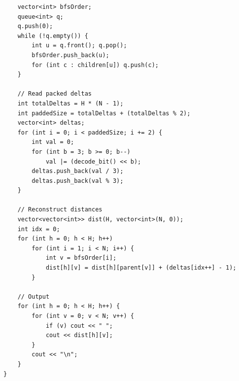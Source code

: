 \documentclass[11pt,a4paper]{article}
\begin{document}
\begin{lstlisting}
    vector<int> bfsOrder;
    queue<int> q;
    q.push(0);
    while (!q.empty()) {
        int u = q.front(); q.pop();
        bfsOrder.push_back(u);
        for (int c : children[u]) q.push(c);
    }

    // Read packed deltas
    int totalDeltas = H * (N - 1);
    int paddedSize = totalDeltas + (totalDeltas % 2);
    vector<int> deltas;
    for (int i = 0; i < paddedSize; i += 2) {
        int val = 0;
        for (int b = 3; b >= 0; b--)
            val |= (decode_bit() << b);
        deltas.push_back(val / 3);
        deltas.push_back(val % 3);
    }

    // Reconstruct distances
    vector<vector<int>> dist(H, vector<int>(N, 0));
    int idx = 0;
    for (int h = 0; h < H; h++)
        for (int i = 1; i < N; i++) {
            int v = bfsOrder[i];
            dist[h][v] = dist[h][parent[v]] + (deltas[idx++] - 1);
        }

    // Output
    for (int h = 0; h < H; h++) {
        for (int v = 0; v < N; v++) {
            if (v) cout << " ";
            cout << dist[h][v];
        }
        cout << "\n";
    }
}
\end{lstlisting}
\end{document}
